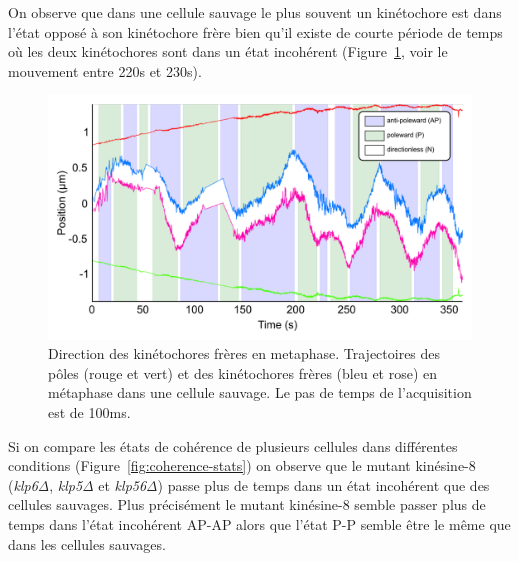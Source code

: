 \documentclass[12pt,a4paper,twoside,openright]{book}
\begin{document}
On observe que dans une cellule sauvage le plus souvent un kinétochore
est dans l'état opposé à son kinétochore frère bien qu'il existe de
courte période de temps où les deux kinétochores sont dans un état
incohérent (Figure~\ref{fig:coherence_kymo}, voir le mouvement entre
220s et 230s).

\begin{figure}[htbp]
\centering
\includegraphics{figures/results/imaging/coherence_kymo.png}
\caption[Direction des kinétochores frères en metaphase.]{\label{fig:coherence_kymo}Direction
des kinétochores frères en metaphase. Trajectoires des pôles (rouge et
vert) et des kinétochores frères (bleu et rose) en métaphase dans une
cellule sauvage. Le pas de temps de l'acquisition est de 100ms.}
\end{figure}

Si on compare les états de cohérence de plusieurs cellules dans
différentes conditions (Figure~\ref{fig:coherence-stats}) on observe que
le mutant kinésine-8 (\emph{klp6Δ}, \emph{klp5Δ} et \emph{klp56Δ}) passe
plus de temps dans un état incohérent que des cellules sauvages. Plus
précisément le mutant kinésine-8 semble passer plus de temps dans l'état
incohérent AP-AP alors que l'état P-P semble être le même que dans les
cellules sauvages.
\end{document}
